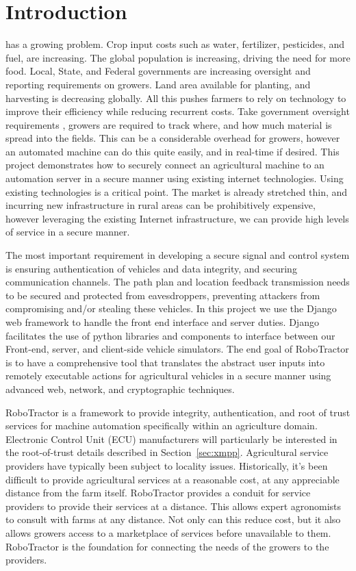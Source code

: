 \documentclass[conference,12pt]{IEEEtran}
\begin{document}
\section{Introduction}
 has a growing problem. Crop input costs such as water,
fertilizer, pesticides, and fuel, are increasing. The global population is
increasing, driving the need for more food. Local, State, and Federal governments
are increasing oversight and reporting requirements on growers. Land area
available for planting, and harvesting is decreasing globally. All this pushes
farmers to rely on technology to improve their efficiency while reducing
recurrent costs. Take government oversight requirements
\autocite{_growers_oversight}, growers are required to track where, and how much
material is spread into the fields.  This can be a considerable overhead for
growers, however an automated machine can do this quite easily, and in real-time
if desired.  This project demonstrates how to securely connect an agricultural
machine to an automation server in a secure manner using existing internet
technologies. Using existing technologies is a critical point. The market is
already stretched thin, and incurring new infrastructure in rural areas can be
prohibitively expensive, however leveraging the existing Internet infrastructure, we
can provide high levels of service in a secure manner.

The most important requirement in developing a secure signal and control system is ensuring authentication of vehicles and data integrity, and securing communication channels. The path plan and location feedback transmission needs to be secured and protected from eavesdroppers, preventing attackers from compromising and/or stealing these vehicles. In this project we use the Django web framework to handle the front end interface and server duties. Django facilitates the use of python libraries and components to interface between our Front-end, server, and client-side vehicle simulators. The end goal of RoboTractor is to have a comprehensive tool that translates the abstract user inputs into remotely executable actions for agricultural vehicles in a secure manner using advanced web, network, and cryptographic techniques.

RoboTractor is a framework to provide integrity, authentication, and root of
trust services for machine automation specifically within an agriculture domain.
Electronic Control Unit (ECU) manufacturers will particularly be interested in the root-of-trust details
described in Section~\ref{sec:xmpp}.  Agricultural service providers have
typically been subject to locality issues. Historically, it's been difficult to
provide agricultural services at a reasonable cost, at any appreciable distance
from the farm itself.  RoboTractor provides a conduit for service providers to
provide their services at a distance. This allows expert agronomists to consult
with farms at any distance.  Not only can this reduce cost, but it also allows
growers access to a marketplace of services before unavailable to them.
RoboTractor is the foundation for connecting the needs of the growers to the
providers.  
\end{document}
